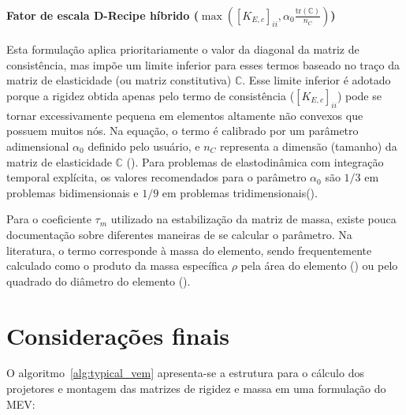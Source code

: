     \paragraph{Fator de escala D-Recipe híbrido ($\max\left([K_{E,c}]_{ii}, \alpha_0 \frac{\text{tr}(\mathbb{C})}{n_C}\right)$)} Esta formulação aplica prioritariamente o valor da diagonal da matriz de consistência, mas impõe um limite inferior para esses termos baseado no traço da matriz de elasticidade (ou matriz constitutiva) $\mathbb{C}$. Esse limite inferior é adotado porque a rigidez obtida apenas pelo termo de consistência ($[K_{E,c}]_{ii}$) pode se tornar excessivamente pequena em elementos altamente não convexos que possuem muitos nós. Na equação, o termo é calibrado por um parâmetro adimensional $\alpha_0$ definido pelo usuário, e $n_C$ representa a dimensão (tamanho) da matriz de elasticidade $\mathbb{C}$ (\citet{nonconvexmesheselastodynamicsusingvirtualelementmethodsexplicittimeintegration2019a}). Para problemas de elastodinâmica com integração temporal explícita, os valores recomendados para o parâmetro $\alpha_0$ são $1/3$ em problemas bidimensionais e $1/9$ em problemas tridimensionais(\citet{numericalrecipeselastodynamicvirtualelementmethodsexplicittimeintegration2020}).

    \vspace{1em}
    \indent Para o coeficiente $\tau_m$ utilizado na estabilização da matriz de massa, existe pouca documentação sobre diferentes maneiras de se calcular o parâmetro. Na literatura, o termo corresponde à massa do elemento, sendo frequentemente calculado como o produto da massa específica $\rho$ pela área do elemento (\citet{numericalrecipeselastodynamicvirtualelementmethodsexplicittimeintegration2020}) ou pelo quadrado do diâmetro do elemento (\citet{antonietti2020virtual}).  

\section{Considerações finais}

    \indent O algoritmo~\ref{alg:typical_vem} apresenta-se a estrutura para o cálculo dos projetores e montagem das matrizes de rigidez e massa em uma formulação do MEV: 

